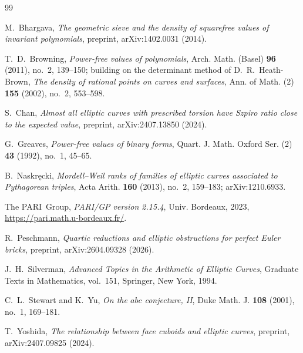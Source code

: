 \documentclass[11pt,reqno]{amsart}
\theoremstyle{plain}
\theoremstyle{definition}
\begin{document}
\begin{thebibliography}{99}

M.~Bhargava,
\emph{The geometric sieve and the density of squarefree values of invariant
polynomials},
preprint, arXiv:1402.0031 (2014).

T.~D.~Browning,
\emph{Power-free values of polynomials},
Arch. Math. (Basel) \textbf{96} (2011), no.~2, 139--150;
building on the determinant method of D.~R.~Heath-Brown,
\emph{The density of rational points on curves and surfaces},
Ann. of Math. (2) \textbf{155} (2002), no.~2, 553--598.

S.~Chan,
\emph{Almost all elliptic curves with prescribed torsion have Szpiro ratio close
to the expected value},
preprint, arXiv:2407.13850 (2024).

G.~Greaves,
\emph{Power-free values of binary forms},
Quart. J. Math. Oxford Ser. (2) \textbf{43} (1992), no.~1, 45--65.

B.~Naskr\k{e}cki,
\emph{Mordell--Weil ranks of families of elliptic curves associated to
Pythagorean triples},
Acta Arith. \textbf{160} (2013), no.~2, 159--183; arXiv:1210.6933.

The PARI~Group,
\emph{PARI/GP version 2.15.4},
Univ. Bordeaux, 2023,
\url{https://pari.math.u-bordeaux.fr/}.

R.~Peschmann,
\emph{Quartic reductions and elliptic obstructions for perfect Euler bricks},
preprint, arXiv:2604.09328 (2026).

J.~H.~Silverman,
\emph{Advanced Topics in the Arithmetic of Elliptic Curves},
Graduate Texts in Mathematics, vol.~151, Springer, New York, 1994.

C.~L.~Stewart and K.~Yu,
\emph{On the $abc$ conjecture, II},
Duke Math. J. \textbf{108} (2001), no.~1, 169--181.

T.~Yoshida,
\emph{The relationship between face cuboids and elliptic curves},
preprint, arXiv:2407.09825 (2024).

\end{thebibliography}
\end{document}
